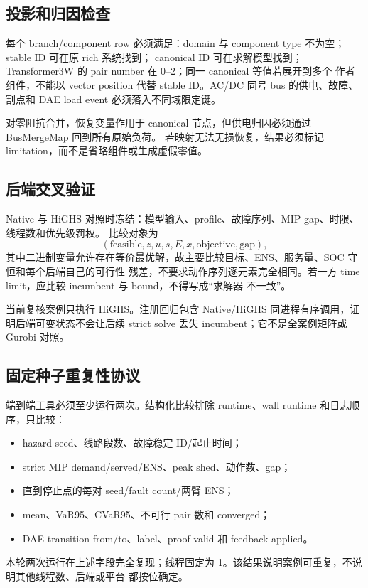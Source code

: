 \subsection{投影和归因检查}

每个 branch/component row 必须满足：domain 与 component type 不为空；stable ID 可在原 rich 系统找到；
canonical ID 可在求解模型找到；Transformer3W 的 pair number 在 0--2；同一 canonical 等值若展开到多个
作者组件，不能以 vector position 代替 stable ID。AC/DC 同号 bus 的供电、故障、割点和 DAE load
event 必须落入不同域限定键。

对零阻抗合并，恢复变量作用于 canonical 节点，但供电归因必须通过 BusMergeMap 回到所有原始负荷。
若映射无法无损恢复，结果必须标记 limitation，而不是省略组件或生成虚假零值。

\subsection{后端交叉验证}

Native 与 HiGHS 对照时冻结：模型输入、profile、故障序列、MIP gap、时限、线程数和优先级罚权。
比较对象为
\begin{equation}
 (\text{feasible},z,u,s,E,x,\text{objective},\text{gap}),
\end{equation}
其中二进制变量允许存在等价最优解，故主要比较目标、ENS、服务量、SOC 守恒和每个后端自己的可行性
残差，不要求动作序列逐元素完全相同。若一方 time limit，应比较 incumbent 与 bound，不得写成“求解器
不一致”。

当前复核案例只执行 HiGHS。注册回归包含 Native/HiGHS 同进程有序调用，证明后端可变状态不会让后续
strict solve 丢失 incumbent；它不是全案例矩阵或 Gurobi 对照。

\subsection{固定种子重复性协议}

端到端工具必须至少运行两次。结构化比较排除 runtime、wall runtime 和日志顺序，只比较：
\begin{itemize}
 \item hazard seed、线路段数、故障稳定 ID/起止时间；
 \item strict MIP demand/served/ENS、peak shed、动作数、gap；
 \item 直到停止点的每对 seed/fault count/两臂 ENS；
 \item mean、VaR95、CVaR95、不可行 pair 数和 converged；
 \item DAE transition from/to、label、proof valid 和 feedback applied。
\end{itemize}
本轮两次运行在上述字段完全复现；线程固定为 1。该结果说明案例可重复，不说明其他线程数、后端或平台
都按位确定。

